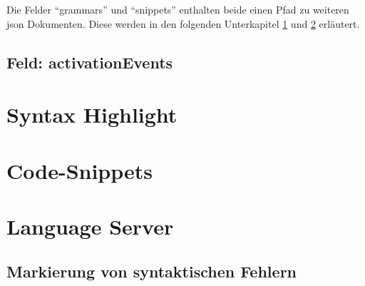Die Felder \enquote{grammars} und \enquote{snippets} enthalten beide einen Pfad zu weiteren \ac{json} Dokumenten. Diese werden in den folgenden Unterkapitel \ref{sec:SyntaxHighlight} und \ref{sec:code-snippet} erläutert. 


\subsection{Feld: activationEvents}

\section{Syntax Highlight}\label{sec:SyntaxHighlight}

\section{Code-Snippets}\label{sec:code-snippet}

\section{Language Server}
\subsection{Markierung von syntaktischen Fehlern}